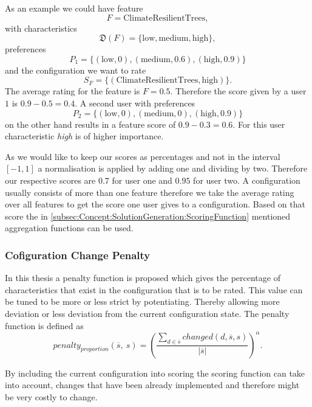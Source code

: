 As an example we could have feature
\begin{equation}
    F = \text{ClimateResilientTrees},
\end{equation} with characteristics
\begin{equation}
    \mathfrak{D}(F)= \{\text{low}, \text{medium}, \text{high}\},
\end{equation}
preferences
\begin{equation}
    P_1 = \{(\text{low}, 0), (\text{medium},0.6), (\text{high},0.9) \}
\end{equation} 
and the configuration we want to rate
\begin{equation}
    S_F = \{(\text{ClimateResilientTrees}, \text{high})\}.
\end{equation}
The average rating for the feature is $F = 0.5$. Therefore the score given by a user $1$ is $0.9-0.5 = 0.4$.
A second user with preferences 
\begin{equation}
    P_2 = \{(\text{low}, 0), (\text{medium},0), (\text{high},0.9) \}
\end{equation} 
on the other hand results in a feature score of $0.9-0.3=0.6$. For this user characteristic \emph{high} is of higher importance.

As we would like to keep our scores as percentages and not in the interval $[-1,1]$ a normalisation is applied by adding one and dividing by two. Therefore our respective scores are $0.7$ for user one and $0.95$ for user two. A configuration usually consists of more than one feature therefore we take the average rating over all features to get the score one user gives to a configuration. Based on that score the in \autoref{subsec:Concept:SolutionGeneration:ScoringFunction} mentioned aggregation functions can be used.

\subsubsection{Cofiguration Change Penalty}

In this thesis a penalty function is proposed which gives the percentage of characteristics that exist in the configuration that is to be rated. This value can be tuned to be more or less strict by potentiating. Thereby allowing more deviation or less deviation from the current configuration state. The penalty function is defined as
\begin{equation}
    penalty_{proportion}(\overline{s},\ s) =  \left(\frac{\sum_{d \in \overline{s}} changed(d,\overline{s}, s)}{|\overline{s}|}\right)^\alpha.
\end{equation}

By including the current configuration into scoring the scoring function can take into account, changes that have been already implemented and therefore might be very costly to change.
    
